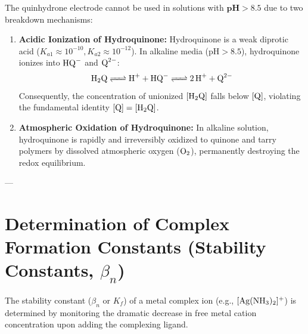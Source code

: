 \begin{conceptbox}
The quinhydrone electrode cannot be used in solutions with $\mathbf{\text{pH} > 8.5}$ due to two breakdown mechanisms:
\begin{enumerate}[leftmargin=*]
    \item \textbf{Acidic Ionization of Hydroquinone:}
    Hydroquinone is a weak diprotic acid ($K_{a1} \approx 10^{-10}, K_{a2} \approx 10^{-12}$). In alkaline media ($\text{pH} > 8.5$), hydroquinone ionizes into $\ce{HQ-}$ and $\ce{Q^2-}$:
    \begin{equation*}
        \ce{H2Q <=> H+ + HQ- <=> 2H+ + Q^2-}
    \end{equation*}
    Consequently, the concentration of unionized $[\ce{H2Q}]$ falls below $[\ce{Q}]$, violating the fundamental identity $[\ce{Q}] = [\ce{H2Q}]$.
    \item \textbf{Atmospheric Oxidation of Hydroquinone:}
    In alkaline solution, hydroquinone is rapidly and irreversibly oxidized to quinone and tarry polymers by dissolved atmospheric oxygen ($\ce{O2}$), permanently destroying the redox equilibrium.
\end{enumerate}
\end{conceptbox}

---

\section{Determination of Complex Formation Constants (Stability Constants, $\beta_n$)}

The stability constant ($\beta_n$ or $K_f$) of a metal complex ion (e.g., $[\ce{Ag(NH3)2}]^+$) is determined by monitoring the dramatic decrease in free metal cation concentration upon adding the complexing ligand.

